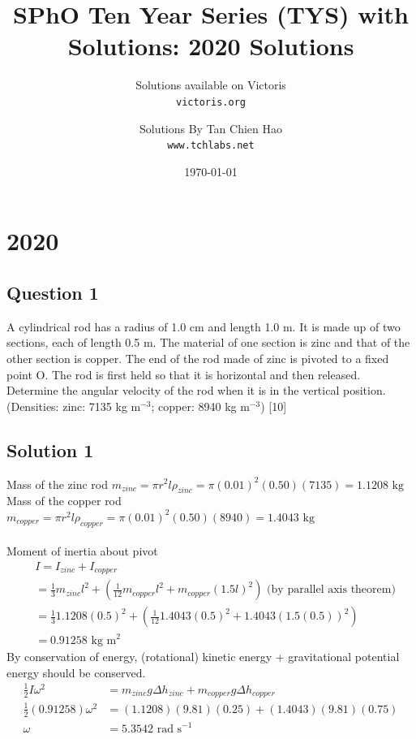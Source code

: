 \documentclass{article}
\title{SPhO Ten Year Series (TYS) with Solutions: 2020 Solutions}
\author{
    Solutions available on Victoris\\
    \texttt{victoris.org}
    \and 
    Solutions By Tan Chien Hao\\
    \texttt{www.tchlabs.net}
}
\date{\today}
\begin{document}
\maketitle

\section{2020}
\subsection{Question 1}
A cylindrical rod has a radius of 1.0 cm and length 1.0 m. It is made up of two sections, each of length 0.5 m. The material of one section is zinc and that of the other section is copper. The end of the rod made of zinc is pivoted to a fixed point O. The rod is first held so that it is horizontal and then released. Determine the angular velocity of the rod when it is in the vertical position. (Densities: zinc: 7135 kg $\text{m}^{-3}$; copper: 8940 kg $\text{m}^{-3}$) [10]

\subsection{Solution 1}
Mass of the zinc rod $m_{zinc} = \pi r^2 l \rho_{zinc} = \pi (0.01)^2 (0.50) (7135) = 1.1208 \text{ kg}$ \\
Mass of the copper rod $m_{copper} = \pi r^2 l \rho_{copper} = \pi (0.01)^2 (0.50) (8940) = 1.4043 \text{ kg}$ \\
\\ Moment of inertia about pivot 
\begin{align}
	&I=I_{zinc} + I_{copper}\\
	&=\frac{1}{3} m_{zinc} l^2 + \left(\frac{1}{12} m_{copper} l^2 + m_{copper} (1.5l)^2\right) \text{ (by parallel axis theorem)} \\
	&= \frac{1}{3} 1.1208 (0.5)^2 + \left(\frac{1}{12} 1.4043 (0.5)^2 + 1.4043 (1.5(0.5))^2\right) \\
	&= 0.91258 \text{ kg m}^2
\end{align}
By conservation of energy, (rotational) kinetic energy + gravitational potential energy should be conserved.
\begin{align}
	\frac{1}{2} I \omega^2 &= m_{zinc}g \Delta h_{zinc} + m_{copper}g \Delta h_{copper} \\
	\frac{1}{2}(0.91258) \omega^2 &= (1.1208)(9.81)(0.25) + (1.4043)(9.81)(0.75) \\
	\omega &= 5.3542 \text{ rad s}^{-1}
\end{align}
\end{document}
